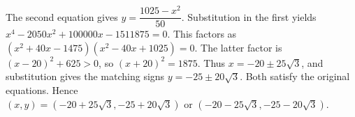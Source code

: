The second equation gives $y=\dfrac{1025-x^2}{50}$. Substitution in the first yields $x^4-2050x^2+100000x-1511875=0$. This factors as $(x^2+40x-1475)(x^2-40x+1025)=0$. The latter factor is $(x-20)^2+625>0$, so $(x+20)^2=1875$. Thus $x=-20\pm25\sqrt3$, and substitution gives the matching signs $y=-25\pm20\sqrt3$. Both satisfy the original equations. Hence $\boxed{(x,y)=(-20+25\sqrt3,-25+20\sqrt3)\text{ or }(-20-25\sqrt3,-25-20\sqrt3)}$.
